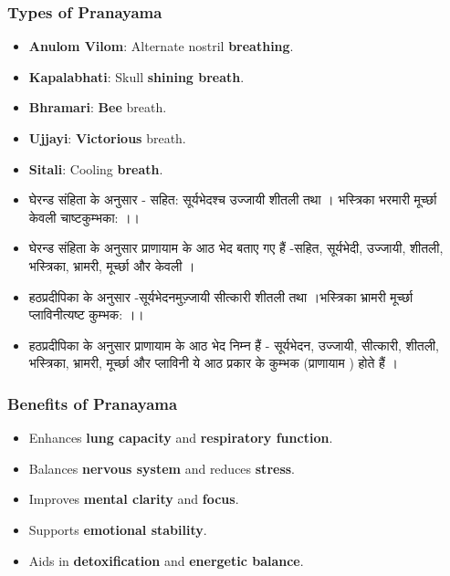 \begin{frame}[fragile]\frametitle{Types of Pranayama}

      \begin{itemize}
        \item \textbf{Anulom Vilom}: Alternate nostril \textbf{breathing}.
        \item \textbf{Kapalabhati}: Skull \textbf{shining breath}.
        \item \textbf{Bhramari}: \textbf{Bee} breath.
        \item \textbf{Ujjayi}: \textbf{Victorious} breath.
        \item \textbf{Sitali}: Cooling \textbf{breath}.
        \item घेरन्ड संहिता के अनुसार - सहित: सूर्यभेदश्च उज्जायी शीतली तथा । भस्त्रिका भरमारी मूर्च्छा केवली चाष्टकुम्भका: ।।
        \item घेरन्ड संहिता के अनुसार प्राणायाम के आठ भेद बताए गए हैं -सहित, सूर्यभेदी, उज्जायी, शीतली, भस्त्रिका, भ्रामरी, मूर्च्छा और केवली ।
        \item हठप्रदीपिका के अनुसार -सूर्यभेदनमुज़्जायी सीत्कारी शीतली तथा ।भस्त्रिका भ्रामरी मूर्च्छा प्लाविनीत्यष्ट कुम्भक: ।।
        \item हठप्रदीपिका के अनुसार प्राणायाम के आठ भेद निम्न हैं - सूर्यभेदन, उज्जायी, सीत्कारी, शीतली, भस्त्रिका, भ्रामरी, मूर्च्छा और प्लाविनी ये आठ प्रकार के कुम्भक (प्राणायाम ) होते हैं ।
		
      \end{itemize}

\end{frame}

\begin{frame}[fragile]\frametitle{Benefits of Pranayama}
      \begin{itemize}
        \item Enhances \textbf{lung capacity} and \textbf{respiratory function}.
        \item Balances \textbf{nervous system} and reduces \textbf{stress}.
        \item Improves \textbf{mental clarity} and \textbf{focus}.
        \item Supports \textbf{emotional stability}.
        \item Aids in \textbf{detoxification} and \textbf{energetic balance}.
      \end{itemize}

\end{frame}

